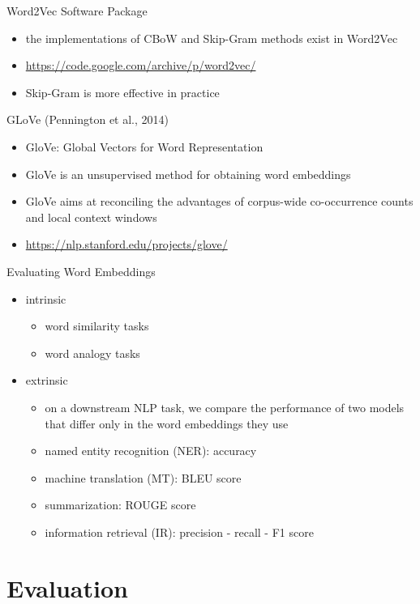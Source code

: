 \documentclass[12pt, handout]{beamer}
\begin{document}
\begin{frame}{Word2Vec Software Package}
	\begin{itemize}
		\item<1-> the implementations of CBoW and Skip-Gram methods exist in Word2Vec
		\item<1-> \url{https://code.google.com/archive/p/word2vec/}
		\item<2-> Skip-Gram is more effective in practice
	\end{itemize}
\end{frame}
\begin{frame}{GLoVe (Pennington et al., 2014)}\begin{itemize}
		\item GloVe: Global Vectors for Word Representation
		\item GloVe is an unsupervised method for obtaining word embeddings
		\item GloVe aims at reconciling the advantages of corpus-wide co-occurrence counts and local context windows
		\item \url{https://nlp.stanford.edu/projects/glove/}
	\end{itemize}
\end{frame}
\begin{frame}{Evaluating Word Embeddings}
	\begin{itemize}
		\item<1-> intrinsic
		\begin{itemize}
			\item<2-> word similarity tasks
			\item<2-> word analogy tasks
		\end{itemize}
		\item<3-> extrinsic
		\begin{itemize}
			\item<4-> on a downstream NLP task, we compare the performance of two models that differ only in the word embeddings they use
			\item<5-> named entity recognition (NER): accuracy
			\item<6-> machine translation (MT): BLEU score
			\item<7-> summarization: ROUGE score
			\item<8-> information retrieval (IR): precision - recall - F1 score
		\end{itemize}
	\end{itemize}
\end{frame}

\section{Evaluation}
\end{document}
